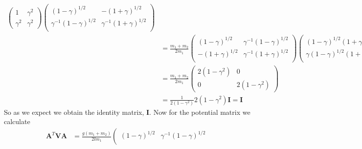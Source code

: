 \documentclass[11pt]{article}
\numberwithin{equation}{section}
\begin{document}
\begin{enumerate}[(a)]
\begin{align*}
                      \left(\begin{array}{cc}
                         1             &\gamma^2\\
                         \gamma^2      &\gamma^2
                     \end{array}\right)
                    \left(\begin{array}{cc} 
                         (1-\gamma)^{1/2}          &-(1+\gamma)^{1/2}\\
                         \gamma^{-1}(1-\gamma)^{1/2}    &\gamma^{-1}(1+\gamma)^{1/2}\\
                     \end{array}\right)\\
&= \frac{m_1+m_2}{2m_1}
                     \left(\begin{array}{cc} 
                         (1-\gamma)^{1/2}          &\gamma^{-1}(1-\gamma)^{1/2}\\
                         -(1+\gamma)^{1/2}         &\gamma^{-1}(1+\gamma)^{1/2}\\
                      \end{array}\right)
                      \left(\begin{array}{cc}
                          (1-\gamma)^{1/2}(1+\gamma)           &(1+\gamma)^{1/2}(\gamma-1)\\ 
                          \gamma(1-\gamma)^{1/2}(1+\gamma)     &-\gamma(1+\gamma)^{1/2}(\gamma-1)\\ 
                      \end{array}\right)\\
&= \frac{m_1+m_2}{2m_1}
                     \left(\begin{array}{cc} 
                         2(1-\gamma^2)                  &0\\
                         0                              &2(1-\gamma^2)
                      \end{array}\right)\\
&= \frac{1}{2(1-\gamma^2)}2(1-\gamma^2)\mathbf{I} = \mathbf{I}
\end{align*}
So as we expect we obtain the identity matrix, $\mathbf{I}$. Now for the potential matrix we
calculate
\begin{align*}
\mathbf{A}^T\mathbf{V}\mathbf{A} &= \frac{g(m_1+m_2)}{2lm_1}
                     \left(\begin{array}{cc} 
                         (1-\gamma)^{1/2}          &\gamma^{-1}(1-\gamma)^{1/2}\\

\end{array}
\end{align*}
\end{enumerate}
\end{document}
